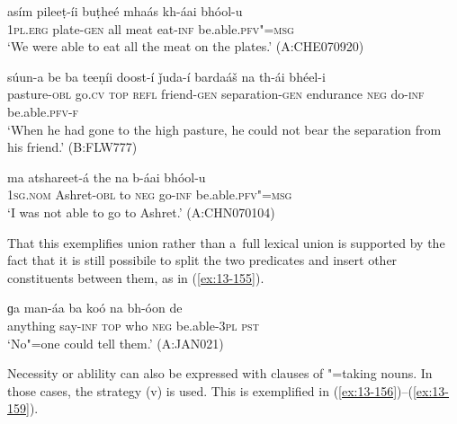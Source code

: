 \begin{exe}
\ex
\label{ex:13-152}
\gll asím pileeṭ-íi buṭheé mhaás kh-áai bhóol-u\\
\textsc{1pl.erg} plate-\textsc{gen} all meat eat-\textsc{inf} be.able.\textsc{pfv"=msg}\\
\glt `We were able to eat all the meat on the plates.' (A:CHE070920)

\ex
\label{ex:13-153}
\gll súun-a be ba teeṇíi doost-í  ǰuda-í bardaáš na th-ái bhéel-i \\
pasture-\textsc{obl} go.\textsc{cv} \textsc{top} \textsc{refl} friend-\textsc{gen} separation-\textsc{gen} endurance \textsc{neg} do-\textsc{inf} be.able.\textsc{pfv-f}  \\
\glt `When he had gone to the high pasture, he could not bear the separation from his friend.' (B:FLW777)

\ex
\label{ex:13-154}
\gll ma atshareet-á the na b-áai bhóol-u  \\
\textsc{1sg.nom} Ashret-\textsc{obl} to \textsc{neg} go-\textsc{inf} be.able.\textsc{pfv"=msg}  \\
\glt `I was not able to go to Ashret.' (A:CHN070104) 
\end{exe}

That this exemplifies  union rather than a~full lexical union is supported by the fact that it is still possibile to split the two predicates and insert other constituents between them, as in (\ref{ex:13-155}).

\begin{exe}
\ex
\label{ex:13-155}
\gll ɡa man-áa ba koó na bh-óon de  \\
anything say-\textsc{inf} \textsc{top} who \textsc{neg} be.able-\textsc{3pl} \textsc{pst}  \\
\glt `No"=one could tell them.' (A:JAN021) 
\end{exe}

Necessity or ablility can also be expressed with  clauses of "=taking nouns. In those cases, the  strategy (v) is used. This is exemplified in (\ref{ex:13-156})--(\ref{ex:13-159}).

